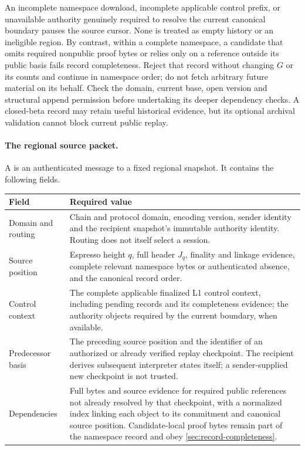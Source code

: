 An incomplete namespace download, incomplete applicable control prefix,
or unavailable authority genuinely required to resolve the current
canonical boundary pauses the source cursor. None is treated as empty
history or an ineligible region. By contrast, within a complete
namespace, a candidate that omits required nonpublic proof bytes or
relies only on a reference outside its public basis fails record completeness.
Reject that record without changing $G$ or its counts and continue in
namespace order; do not fetch arbitrary future material on its behalf.
Check the domain, current base, open version and structural append
permission before undertaking its deeper dependency checks. A closed-beta
record may retain useful historical evidence, but its optional archival
validation cannot block current public replay.

\paragraph{The regional source packet.}
A  is an authenticated message to a fixed regional
snapshot. It contains the following fields.
\begin{table}[htbp]\centering\small
\begin{tabularx}{\linewidth}{@{}>{\raggedright\arraybackslash}p{.25\linewidth}Y@{}}\toprule
Field & Required value\\\midrule
Domain and routing & Chain and protocol domain, encoding version,
sender identity and the recipient snapshot's immutable authority
identity. Routing does not itself select a session.\\
Source position & Espresso height $q$, full header $J_q$, finality
and linkage evidence, complete relevant namespace bytes or authenticated
absence, and the canonical record order.\\
Control context & The complete applicable finalized L1 control context,
including pending records and its completeness evidence; the authority
objects required by the current boundary, when available.\\
Predecessor basis & The preceding source position and the identifier of
an authorized or already verified replay checkpoint. The recipient
derives subsequent interpreter states itself; a sender-supplied new
checkpoint is not trusted.\\
Dependencies & Full bytes and source evidence for required public
references not already resolved by that checkpoint, with a normalized
index linking each object to its commitment and canonical source
position. Candidate-local proof bytes remain part of the namespace
record and obey \cref{sec:record-completeness}.\\\bottomrule
\end{tabularx}
\end{table}

